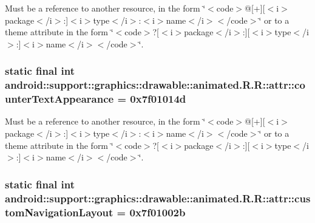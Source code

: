 Must be a reference to another resource, in the form \char`\"{}$<$code$>$@\mbox{[}+\mbox{]}\mbox{[}$<$i$>$package$<$/i$>$:\mbox{]}$<$i$>$type$<$/i$>$:$<$i$>$name$<$/i$>$$<$/code$>$\char`\"{} or to a theme attribute in the form \char`\"{}$<$code$>$?\mbox{[}$<$i$>$package$<$/i$>$:\mbox{]}\mbox{[}$<$i$>$type$<$/i$>$:\mbox{]}$<$i$>$name$<$/i$>$$<$/code$>$\char`\"{}. \hypertarget{classandroid_1_1support_1_1graphics_1_1drawable_1_1animated_1_1_r_1_1attr_0c8281038ece5a167e817b2f3162f549}{
\subsubsection[{counterTextAppearance}]{\setlength{\rightskip}{0pt plus 5cm}static final int android::support::graphics::drawable::animated.R.R::attr::counterTextAppearance = 0x7f01014d}}
\label{classandroid_1_1support_1_1graphics_1_1drawable_1_1animated_1_1_r_1_1attr_0c8281038ece5a167e817b2f3162f549}


Must be a reference to another resource, in the form \char`\"{}$<$code$>$@\mbox{[}+\mbox{]}\mbox{[}$<$i$>$package$<$/i$>$:\mbox{]}$<$i$>$type$<$/i$>$:$<$i$>$name$<$/i$>$$<$/code$>$\char`\"{} or to a theme attribute in the form \char`\"{}$<$code$>$?\mbox{[}$<$i$>$package$<$/i$>$:\mbox{]}\mbox{[}$<$i$>$type$<$/i$>$:\mbox{]}$<$i$>$name$<$/i$>$$<$/code$>$\char`\"{}. \hypertarget{classandroid_1_1support_1_1graphics_1_1drawable_1_1animated_1_1_r_1_1attr_694c2a9f6cd7fab4a0b85512426a453f}{
\subsubsection[{customNavigationLayout}]{\setlength{\rightskip}{0pt plus 5cm}static final int android::support::graphics::drawable::animated.R.R::attr::customNavigationLayout = 0x7f01002b}}
\label{classandroid_1_1support_1_1graphics_1_1drawable_1_1animated_1_1_r_1_1attr_694c2a9f6cd7fab4a0b85512426a453f}


